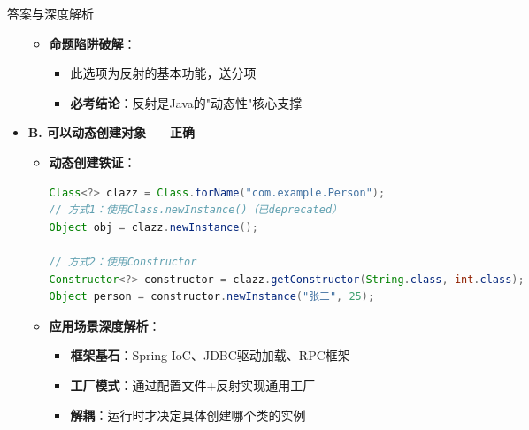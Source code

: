 \documentclass[12pt, a4paper]{ctexart}
\begin{document}
\begin{bluebox}{答案与深度解析}
\begin{itemize}[label={}, leftmargin=*, nosep]
\begin{itemize}[label={}, leftmargin=*, nosep]
			      \item \textbf{命题陷阱破解}：
			            \begin{itemize}[label={}, nosep]
				            \item 此选项为反射的基本功能，送分项
				            \item \textbf{必考结论}：反射是Java的"动态性"核心支撑
			            \end{itemize}
		      \end{itemize}

		\item \textbf{B. 可以动态创建对象 — 正确}
		      \begin{itemize}[label={}, leftmargin=*, nosep]
			      \item \textbf{动态创建铁证}：
			            \begin{lstlisting}[language=Java]
Class<?> clazz = Class.forName("com.example.Person");
// 方式1：使用Class.newInstance()（已deprecated）
Object obj = clazz.newInstance();

// 方式2：使用Constructor
Constructor<?> constructor = clazz.getConstructor(String.class, int.class);
Object person = constructor.newInstance("张三", 25);
      \end{lstlisting}

			      \item \textbf{应用场景深度解析}：
			            \begin{itemize}[label={}, nosep]
				            \item \textbf{框架基石}：Spring IoC、JDBC驱动加载、RPC框架
				            \item \textbf{工厂模式}：通过配置文件+反射实现通用工厂
				            \item \textbf{解耦}：运行时才决定具体创建哪个类的实例
			            \end{itemize}


\end{itemize}
\end{itemize}
\end{bluebox}
\end{document}
